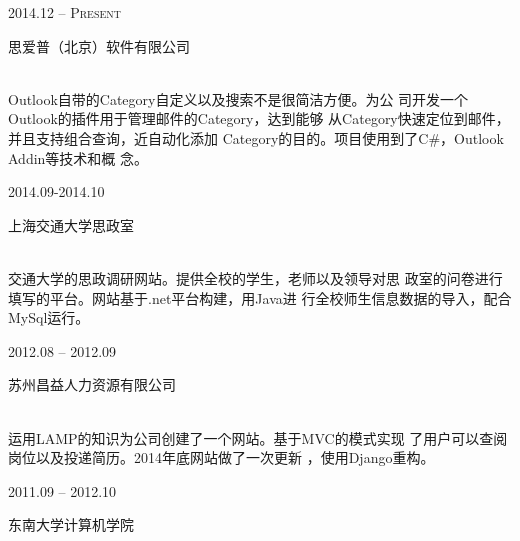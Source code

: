 \documentclass[10pt]{article} %
\begin{document}
{\begin{minipage}[t]{0.5\textwidth}
{\raggedleft\textsc{2014.12 -- Present}\par}

{\raggedright\large 思爱普（北京）软件有限公司\\[8pt]

\\[8pt]}

\normalsize{
Outlook自带的Category自定义以及搜索不是很简洁方便。为公
司开发一个Outlook的插件用于管理邮件的Category，达到能够
从Category快速定位到邮件，并且支持组合查询，近自动化添加
Category的目的。项目使用到了C\#，Outlook Addin等技术和概
念。}\\


{\raggedleft\textsc{2014.09-2014.10}\par}

{\raggedright\large 上海交通大学思政室\\[8pt]

\\[8pt]}

\normalsize{
交通大学的思政调研网站。提供全校的学生，老师以及领导对思
政室的问卷进行填写的平台。网站基于.net平台构建，用Java进
行全校师生信息数据的导入，配合MySql运行。}\\


{\raggedleft\textsc{2012.08 -- 2012.09}\par}

{\raggedright\large 苏州昌益人力资源有限公司\\[8pt] 

\\[8pt]}

\normalsize{
运用LAMP的知识为公司创建了一个网站。基于MVC的模式实现
了用户可以查阅岗位以及投递简历。2014年底网站做了一次更新
，使用Django重构。}\\


{\raggedleft\textsc{2011.09 -- 2012.10}\par}

{\raggedright\large 东南大学计算机学院\\[8pt]

}
\end{minipage}}
\end{document}
